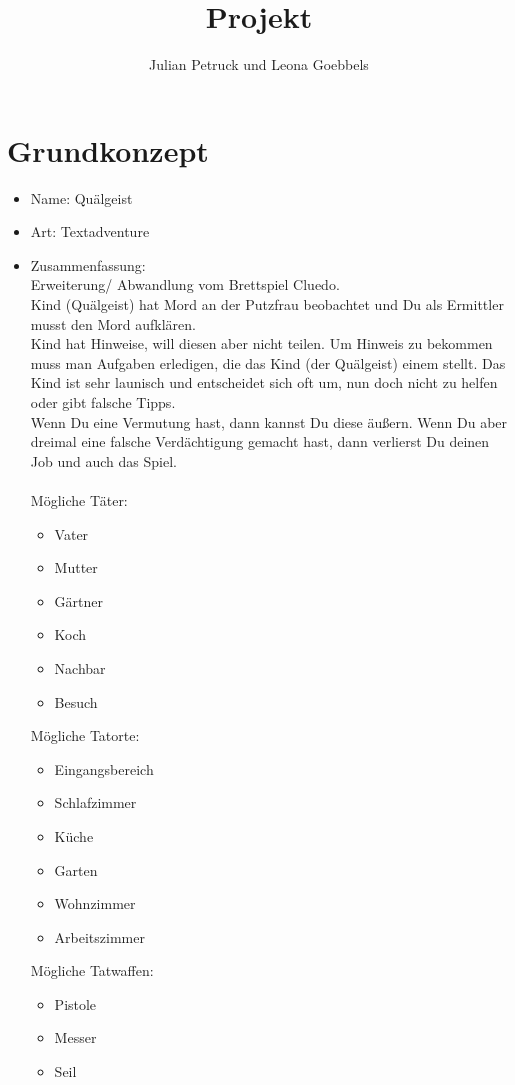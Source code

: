 \documentclass[10pt,a4paper]{article}
\title{Projekt}
\author{Julian Petruck und Leona Goebbels}
\begin{document}
\maketitle
\newcommand{\thetitle} {Projekt}

\section*{Grundkonzept}
\begin{itemize}
\item Name: Quälgeist
\item Art: Textadventure
\item Zusammenfassung:\\
Erweiterung/ Abwandlung vom Brettspiel Cluedo.\\
Kind (Quälgeist) hat Mord an der Putzfrau beobachtet und Du als Ermittler musst den Mord aufklären.\\
Kind hat Hinweise, will diesen aber nicht teilen. Um Hinweis zu bekommen muss man Aufgaben erledigen, die das Kind (der Quälgeist) einem stellt. Das Kind ist sehr launisch und entscheidet sich oft um, nun doch nicht zu helfen oder gibt falsche Tipps.\\
Wenn Du eine Vermutung hast, dann kannst Du diese äußern. 
Wenn Du aber dreimal eine falsche Verdächtigung gemacht hast, dann verlierst Du deinen Job und auch das Spiel.\\
\ \\
Mögliche Täter:
\begin{itemize}
\item Vater
\item Mutter
\item Gärtner
\item Koch
\item Nachbar
\item Besuch
\end{itemize}
Mögliche Tatorte:
\begin{itemize}
\item Eingangsbereich
\item Schlafzimmer
\item Küche
\item Garten
\item Wohnzimmer
\item Arbeitszimmer
\end{itemize}
Mögliche Tatwaffen:
\begin{itemize}
\item Pistole
\item Messer
\item Seil

\end{itemize}
\end{itemize}
\end{document}
